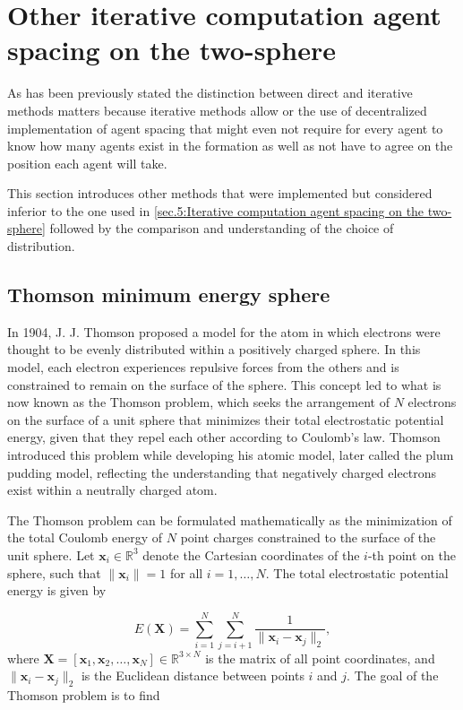 \section{Other iterative computation agent spacing on the two-sphere} \label{annex:Other iterative computation agent spacing on the two-sphere}

As has been previously stated the distinction between direct and iterative methods matters because iterative methods allow or the use of decentralized implementation of agent spacing that might even not require for every agent to know how many agents exist in the formation as well as not have to agree on the position each agent will take.

This section introduces other methods that were implemented but considered inferior to the one used in \ref{sec.5:Iterative computation agent spacing on the two-sphere} followed by the comparison and understanding of the choice of distribution.

\subsection{Thomson minimum energy sphere} \label{annex:Thomson minimum energy sphere}

In 1904, J. J. Thomson proposed a model for the atom in which electrons were thought to be evenly distributed within a positively charged sphere. In this model, each electron experiences repulsive forces from the others and is constrained to remain on the surface of the sphere. This concept led to what is now known as the Thomson problem, which seeks the arrangement of $N$ electrons on the surface of a unit sphere that minimizes their total electrostatic potential energy, given that they repel each other according to Coulomb's law. Thomson introduced this problem while developing his atomic model, later called the plum pudding model, reflecting the understanding that negatively charged electrons exist within a neutrally charged atom.\cite{thomson_min_energy_sphere}

The Thomson problem can be formulated mathematically as the minimization of the total Coulomb energy of $N$ point charges constrained to the surface of the unit sphere. Let $\mathbf{x}_i \in \mathbb{R}^3$ denote the Cartesian coordinates of the $i$-th point on the sphere, such that $\|\mathbf{x}_i\| = 1$ for all $i = 1, \dots, N$. The total electrostatic potential energy is given by

\begin{equation}
E(\mathbf{X}) = \sum_{i=1}^{N} \sum_{j=i+1}^{N} \frac{1}{\|\mathbf{x}_i - \mathbf{x}_j\|_2},
\end{equation}
where $\mathbf{X} = [\mathbf{x}_1, \mathbf{x}_2, \dots, \mathbf{x}_N] \in \mathbb{R}^{3 \times N}$ is the matrix of all point coordinates, and $\|\mathbf{x}_i - \mathbf{x}_j\|_2$ is the Euclidean distance between points $i$ and $j$. The goal of the Thomson problem is to find

